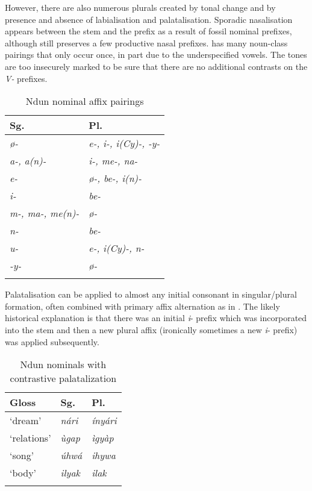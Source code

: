 \documentclass[output=paper]{langsci/langscibook}
\begin{document}
However, there are also numerous plurals created by tonal change and by presence and absence of labialisation and palatalisation. Sporadic nasalisation appears between the stem and the prefix as a result of fossil nominal prefixes, although  still preserves a few productive nasal prefixes.  has many noun-class pairings that only occur once, in part due to the underspecified vowels. The tones are too insecurely marked to be sure that there are no additional contrasts on the \textit{V-} prefixes.

\begin{table}
\caption{\label{tab:nomaffplat:11}Ndun nominal affix pairings}
\begin{tabularx}{.8\textwidth}{Xl}
\lsptoprule
{Sg.} 	& {Pl.}\\
\midrule
\itshape ø- 	& \itshape e-, i-, i(Cy)-, -y-\\
\itshape a-, a(n)- 	& \itshape i-, me-, na-\\
\itshape e- 	& \itshape ø-, be-, i(n)-\\
\itshape i- 	& \itshape be-\\
\itshape m-, ma-, me(n)- 	& \itshape ø-\\
\itshape n- 	& \itshape be-\\
\itshape u- 	& \itshape e-, i(Cy)-, n-\\
\itshape -y- 	& \itshape ø-\\
\lspbottomrule
\end{tabularx}
\end{table}

Palatalisation can be applied to almost any initial consonant in singular/plural formation, often combined with primary affix alternation as in . The likely historical explanation is that there was an initial \textit{i}- prefix which was incorporated into the stem and then a new plural affix (ironically sometimes a new \textit{ i}- prefix) was applied subsequently.


\begin{table}
\caption{Ndun nominals with contrastive palatalization}
\label{extab:nomaffplat:28}
\begin{tabularx}{.8\textwidth}{XXl}
\lsptoprule
Gloss 	& {Sg.} 	& {Pl.}\\
\midrule
‘dream’ 	&  \itshape nári 	&  \itshape ínyári\\
‘relations’ 	&  \itshape ùgap 	&  \itshape ìgyàp\\
‘song’ 	&  \itshape úhwá 	&  \itshape ihywa\\
‘body’ 	&  \itshape ilyak 	&  \itshape ilak\\
\lspbottomrule 
\end{tabularx}
\end{table}
\end{document}
